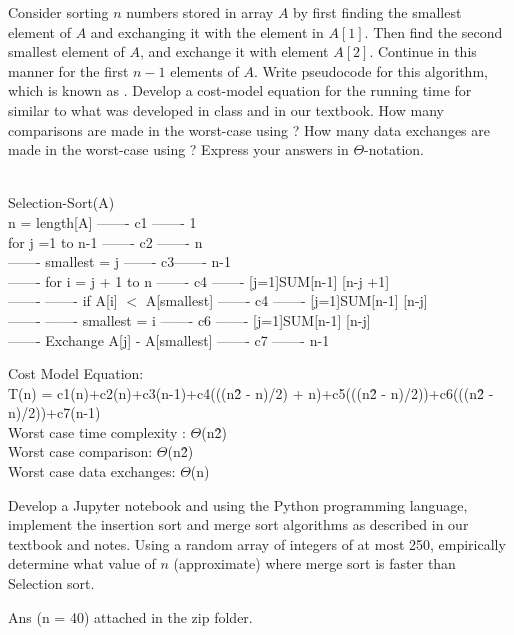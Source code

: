 \documentclass[11pt]{article}
\begin{document}
\begin{questions}
%
%
\question[10]
Consider sorting $n$ numbers stored in array $A$ by first finding the smallest element of $A$ and exchanging it with the element in $A[1]$.  Then find the second smallest element of $A$, and exchange it with element $A[2]$.  Continue in this manner for the first $n-1$ elements of $A$.  Write pseudocode for this algorithm, which is known as .  Develop a cost-model equation for the running time for  similar to what was developed in class and in our textbook.  How many comparisons are made in the worst-case using ?  How many data exchanges are made in the worst-case using ?  Express your answers in $\Theta$-notation.
\begin{solutionorbox}
          \\
	 Selection-Sort(A) \\ 
 n = length[A] ------- c1 -------   1 \\  
 for j =1 to n-1 ------- c2 ------- n \\
 ------- smallest = j ------- c3------- n-1 \\
-------  for i = j + 1 to n ------- c4 -------  [j=1]SUM[n-1] [n-j +1] \\
------- ------- if A[i] $<$ A[smallest] -------  c4 -------  [j=1]SUM[n-1] [n-j] \\
------- ------- smallest = i ------- c6 -------   [j=1]SUM[n-1] [n-j] \\
------- Exchange A[j] - A[smallest] ------- c7 ------- n-1


Cost Model Equation:\\
T(n) = c1(n)+c2(n)+c3(n-1)+c4(((n\^2 - n)/2) + n)+c5(((n\^2 - n)/2))+c6(((n\^2 - n)/2))+c7(n-1)\\
Worst case time complexity :  $\Theta$(n\^2)\\
Worst case comparison: $\Theta$(n\^2)\\
Worst case data exchanges: $\Theta$(n)
\end{solutionorbox}

\ifprintanswers
\newpage
\else
\bigskip
\fi


%
%
\question[15]
Develop a Jupyter notebook and using the Python programming language, implement the insertion sort and merge sort algorithms as described in our textbook and notes.  Using a random array of integers of at most 250, empirically determine what value of $n$ (approximate) where merge sort is faster than Selection sort.
\begin{solutionorbox}
	Ans (n = 40) attached in the zip folder.
\end{solutionorbox}

\ifprintanswers
\newpage
\else
\bigskip
\fi

\end{questions}
\end{document}
